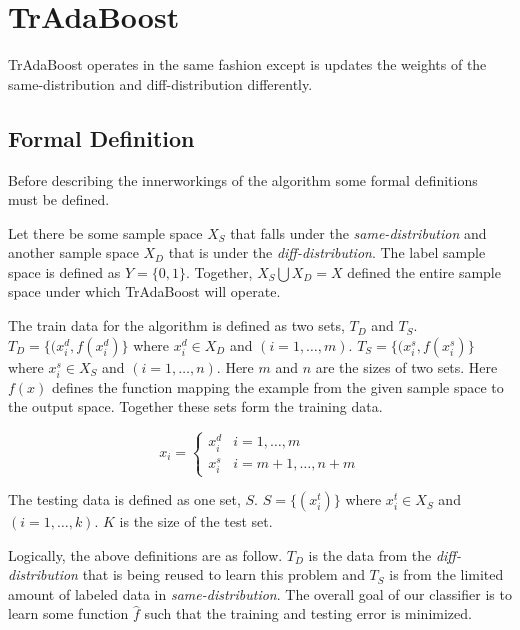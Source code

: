\documentclass[12pt]{article}
\begin{document}
    \section{TrAdaBoost} \label{boost-tradaboost}
      TrAdaBoost operates in the same fashion except is updates the weights of the same-distribution and
      diff-distribution differently.

      \subsection{Formal Definition} \label{boost-tradaboost-def}
        Before describing the innerworkings of the algorithm some formal definitions must be defined.

        Let there be some sample space $X_S$ that falls under the {\it same-distribution} and another sample space $X_D$
        that is under the {\it diff-distribution}. The label sample space is defined as $Y= \{0,1\}$. Together, $X_S \bigcup X_D = X$
        defined the entire sample space under which TrAdaBoost will operate.

        The train data for the algorithm is defined as two sets, $T_D$ and $T_S$. $T_D = \{(x^d_i, f(x^d_i)\}$ where $x^d_i \in X_D$ and
        $(i = 1, \dots, m)$. $T_S = \{(x^s_i, f(x^s_i)\}$ where $x^s_i \in X_S$ and $(i = 1, \dots, n)$. Here $m$ and $n$ are the sizes of
        two sets. Here $f(x)$ defines the function mapping the example from the given sample space to the output space. Together these sets
        form the training data. \autocite{dai_yang_xue_yu_2007}

        \begin{equation}
          x_i =
          \begin{cases}
            x_i^d        & i = 1, \dots, m \\
            x_i^s        & i = m + 1, \dots, n+m
          \end{cases}
        \end{equation}

        The testing data is defined as one set, $S$. $S = \{(x_i^t)\}$ where $x_i^t \in X_S$ and $(i=1, \dots, k)$. $K$ is the size of 
        the test set. \autocite{dai_yang_xue_yu_2007}

        Logically, the above definitions are as follow. $T_D$ is the data from the {\it diff-distribution} that is being reused to learn 
        this problem and $T_S$ is from the limited amount of labeled data in {\it same-distribution}. The overall goal of our classifier is
        to learn some function $\hat{f}$ such that the training and testing error is minimized.
\end{document}
